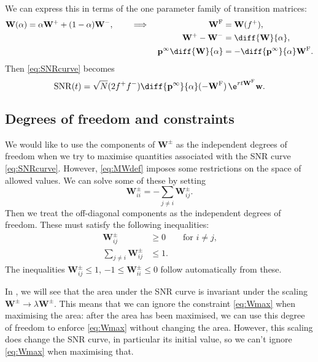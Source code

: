 \documentclass[12pt]{article}
\newcommand{\eq}{\mathbf{p}^\infty}
\newcommand{\w}{\mathbf{w}}
\newcommand{\W}{\mathbf{W}}
\newcommand{\frg}{\W^{\mathrm{F}}}
\DeclareMathOperator{\SNR}{SNR}
\begin{document}
We can express this in terms of the one parameter family of transition matrices:
%
\begin{equation}\label{eq:Walpha}
  \begin{aligned}
  \W(\alpha) &= \alpha\W^++(1-\alpha)\W^-,
  &\quad&\implies&
    \frg&=\W(f^+),\\&&&&
    \W^+ - \W^- &= \diff{\W}{\alpha},\\&&&&
    \eq \diff{\W}{\alpha} &= -\diff{\eq}{\alpha} \frg.
  \end{aligned}
\end{equation}
%
Then \eqref{eq:SNRcurve} becomes
%
\begin{equation}\label{eq:SNRalpha}
  \SNR(t) = \sqrt{N} (2f^+f^-) \diff{\eq}{\alpha}(-\frg)\,\e^{rt\frg}\w.
\end{equation}
%



\subsection{Degrees of freedom and constraints}\label{sec:constraints}

We would like to use the components of $\W^\pm$ as the independent degrees of freedom when we try to maximise quantities associated with the SNR curve \eqref{eq:SNRcurve}.
However, \eqref{eq:MWdef} imposes some restrictions on the space of allowed values.
We can solve some of these by setting
%
\begin{equation}\label{eq:Wdiag}
  \W^\pm_{ii} = -\sum_{j\neq i} \W^\pm_{ij}.
\end{equation}
%
Then we treat the off-diagonal components as the independent degrees of freedom.
These must satisfy the following inequalities:
%
\begin{align}\label{eq:Wmin}
  \W^\pm_{ij} &\geq 0 \qquad \text{for $i \neq j$,}\\
\label{eq:Wmax}
  \sum_{j \neq i} \W^\pm_{ij} &\leq 1.
\end{align}
%
The inequalities $\W^\pm_{ij} \leq 1$, $-1\leq\W^\pm_{ii}\leq0$ follow automatically from these.

In , we will see that the area under the SNR curve is invariant under the scaling $\W^\pm\to\lambda\W^\pm$.
This means that we can ignore the constraint \eqref{eq:Wmax} when maximising the area:
after the area has been maximised, we can use this degree of freedom to enforce \eqref{eq:Wmax} without changing the area.
However, this scaling does change the SNR curve, in particular its initial value, so we can't ignore \eqref{eq:Wmax} when maximising that.
\end{document}
